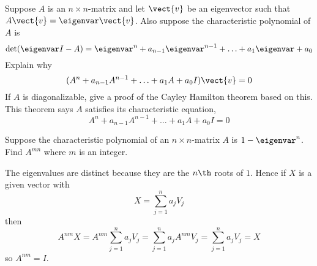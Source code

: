 \begin{ex}
  Suppose $A$ is an $n\times n$-matrix and let $\vect{v}$ be an
  eigenvector such that $A\vect{v}=\eigenvar \vect{v}$. Also suppose the
  characteristic polynomial of $A$ is
  \begin{equation*}
    \det (\eigenvar  I-A) =\eigenvar  ^{n}+a_{n-1} \eigenvar  ^{n-1}+\ldots+a_{1}\eigenvar  +a_{0}
  \end{equation*}
  Explain why
  \begin{equation*}
    (A^{n}+a_{n-1}A^{n-1}+\ldots +a_{1}A+a_{0}I) \vect{v}=0
  \end{equation*}
  If $A$ is diagonalizable, give a proof of the Cayley Hamilton
  theorem based on this. This theorem says $A$ satisfies its
  characteristic equation,
  \begin{equation*}
    A^{n}+a_{n-1}A^{n-1}+\ldots +a_{1}A+a_{0}I=0
  \end{equation*}
\end{ex}

\begin{ex}
  Suppose the characteristic polynomial of an $n\times n$-matrix $A$ is
  $1-\eigenvar ^{n}$. Find $A^{mn}$ where $m$ is an integer.
  \begin{sol}
    The eigenvalues are distinct because
    they are the $n\th$ roots of $1$. Hence if $X$ is a given vector with
    \begin{equation*}
      X=\sum_{j=1}^{n}a_{j}V_{j}
    \end{equation*}
    then
    \begin{equation*}
      A^{nm}X=A^{nm}\sum_{j=1}^{n}a_{j}V_{j}=
      \sum_{j=1}^{n}a_{j}A^{nm}V_{j}=\sum_{j=1}^{n}a_{j}V_{j}=X
    \end{equation*}
    so $A^{nm}=I$.
  \end{sol}
\end{ex}


